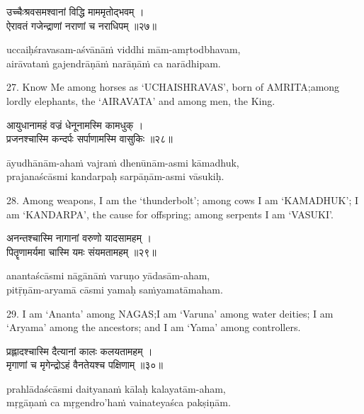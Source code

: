 \begin{gitaverse}
उच्चैःश्रवसमश्वानां विद्धि माममृतोद्भवम् । \\
ऐरावतं गजेन्द्राणां नराणां च नराधिपम् ॥२७॥
\end{gitaverse}

\begin{transliteration}
uccaiḥśravasam-aśvānāṁ viddhi mām-amṛtodbhavam, \\
airāvataṁ gajendrāṇāṁ narāṇāṁ ca narādhipam.
\end{transliteration}

27. Know Me among horses as `UCHAISHRAVAS', born of AMRITA;\@ among lordly
elephants, the `AIRAVATA' and among men, the King.

\begin{gitaverse}
आयुधानामहं वज्रं धेनूनामस्मि कामधुक् । \\
प्रजनश्चास्मि कन्दर्पः सर्पाणामस्मि वासुकिः ॥२८॥
\end{gitaverse}

\begin{transliteration}
āyudhānām-ahaṁ vajraṁ dhenūnām-asmi kāmadhuk, \\
prajanaścāsmi kandarpaḥ sarpāṇām-asmi vāsukiḥ.
\end{transliteration}

28. Among weapons, I am the `thunderbolt'; among cows I am `KAMADHUK'; I am
`KANDARPA', the cause for offspring; among serpents I am `VASUKI'.

\begin{gitaverse}
अनन्तश्चास्मि नागानां वरुणो यादसामहम् । \\
पितॄणामर्यमा चास्मि यमः संयमतामहम् ॥२९॥
\end{gitaverse}

\begin{transliteration}
anantaścāsmi nāgānāṁ varuṇo yādasām-aham, \\
pitṝṇām-aryamā cāsmi yamaḥ saṁyamatāmaham.
\end{transliteration}

29. I am `Ananta' among NAGAS;\@ I am `Varuna' among water deities; I am
`Aryama' among the ancestors; and I am `Yama' among controllers.

\begin{gitaverse}
प्रह्लादश्चास्मि दैत्यानां कालः कलयतामहम् । \\
मृगाणां च मृगेन्द्रोऽहं वैनतेयश्च पक्षिणाम् ॥३०॥
\end{gitaverse}

\begin{transliteration}
prahlādaścāsmi daityanaṁ kālaḥ kalayatām-aham, \\
mṛgāṇaṁ ca mṛgendro'haṁ vainateyaśca pakṣiṇām.
\end{transliteration}

